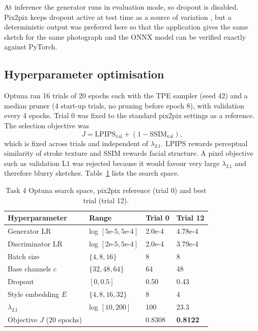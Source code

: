 \documentclass[conference]{IEEEtran}
\begin{document}
At inference the generator runs in evaluation mode, so dropout is disabled. Pix2pix keeps dropout active at test time as a source of variation \cite{isola2017}, but a deterministic output was preferred here so that the application gives the same sketch for the same photograph and the ONNX model can be verified exactly against PyTorch.

\subsection{Hyperparameter optimisation}
Optuna \cite{akiba2019} ran 16 trials of 20 epochs each with the TPE sampler \cite{bergstra2011} (seed 42) and a median pruner (4 start-up trials, no pruning before epoch 8), with validation every 4 epochs. Trial 0 was fixed to the standard pix2pix settings as a reference. The selection objective was
\begin{equation}
J = \text{LPIPS}_{\text{val}} + (1 - \text{SSIM}_{\text{val}}),
\end{equation}
which is fixed across trials and independent of $\lambda_{L1}$. LPIPS \cite{zhang2018lpips} rewards perceptual similarity of stroke texture and SSIM rewards facial structure. A pixel objective such as validation L1 was rejected because it would favour very large $\lambda_{L1}$ and therefore blurry sketches. Table~\ref{tab:t4_optuna} lists the search space.

\begin{table}[t]
\centering
\caption{Task 4 Optuna search space, pix2pix reference (trial 0) and best trial (trial 12).}
\label{tab:t4_optuna}
\footnotesize
\begin{tabular}{@{}llll@{}}
\toprule
Hyperparameter & Range & Trial 0 & Trial 12 \\
\midrule
Generator LR & log $[5\text{e-}5, 5\text{e-}4]$ & 2.0e-4 & 4.78e-4 \\
Discriminator LR & log $[2\text{e-}5, 5\text{e-}4]$ & 2.0e-4 & 3.79e-4 \\
Batch size & $\{4, 8, 16\}$ & 8 & 8 \\
Base channels $c$ & $\{32, 48, 64\}$ & 64 & 48 \\
Dropout & $[0, 0.5]$ & 0.50 & 0.43 \\
Style embedding $E$ & $\{4, 8, 16, 32\}$ & 8 & 4 \\
$\lambda_{L1}$ & log $[10, 200]$ & 100 & 23.3 \\
\midrule
Objective $J$ (20 epochs) & & 0.8308 & \textbf{0.8122} \\
\bottomrule
\end{tabular}
\end{table}
\end{document}
